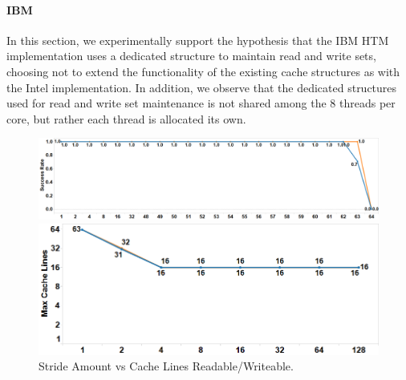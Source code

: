 \paragraph{IBM}

In this section, we experimentally support the hypothesis
that the IBM HTM implementation uses a dedicated structure
to maintain read and write sets, choosing not to extend the 
functionality of the existing cache structures as with
the Intel implementation.  In addition, we observe
that the dedicated structures used for read and write set
maintenance is not shared among the 8 threads per core, but rather
each thread is allocated its own.

\begin{figure}[h]%
\centering
\begin{minipage}[b]{.45\linewidth}
\centering
\includegraphics[width=\linewidth]{images/wttm_capacity_readwrite_ibm}
\caption{Cache Lines Read/Written vs Success Probability. 
}
\label{fig:wttm_capacity_readwrite_ibm}
\end{minipage}%
\quad
\begin{minipage}[b]{.45\linewidth}%
\centering
\includegraphics[width=\linewidth]{images/wttm_stride_readwrite_ibm}
\caption{Stride Amount vs Cache Lines Readable/Writeable. 
}
\label{fig:wttm_stride_readwrite_ibm}
\end{minipage}
\end{figure}


